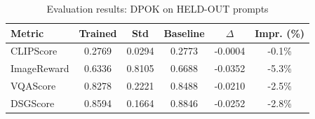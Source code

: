 \begin{table}[h]
\centering
\caption{Evaluation results: DPOK on HELD-OUT prompts}
\label{tab:eval}
\begin{tabular}{lccccc}
\toprule
Metric & Trained & Std & Baseline & $\Delta$ & Impr. (\%) \\
\midrule
CLIPScore & 0.2769 & 0.0294 & 0.2773 & -0.0004 & -0.1\% \\
ImageReward & 0.6336 & 0.8105 & 0.6688 & -0.0352 & -5.3\% \\
VQAScore & 0.8278 & 0.2221 & 0.8488 & -0.0210 & -2.5\% \\
DSGScore & 0.8594 & 0.1664 & 0.8846 & -0.0252 & -2.8\% \\
\bottomrule
\end{tabular}
\end{table}